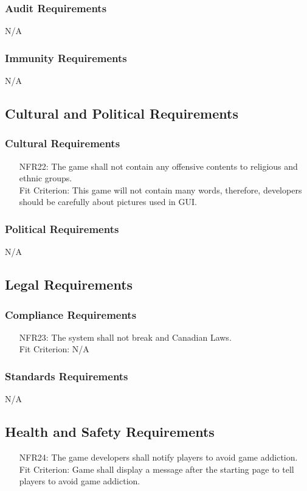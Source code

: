 \documentclass[12pt]{article}
\begin{document}
\subsubsection{Audit Requirements}
N/A
\subsubsection{Immunity Requirements}
N/A
\subsection{Cultural and Political Requirements}
\subsubsection{Cultural Requirements}
\begin{itemize}
\item[NFR22:]The game shall not contain any offensive contents
to religious and ethnic groups. \\Fit Criterion: This game 
will not contain many words, therefore, developers should be
carefully about pictures used in GUI.
\end{itemize}
\subsubsection{Political Requirements}
N/A
\subsection{Legal Requirements}
\subsubsection{Compliance Requirements}
\begin{itemize}
\item[NFR23:]The system shall not break and Canadian Laws. \\Fit Criterion: N/A
\end{itemize}
\subsubsection{Standards Requirements}
N/A
\subsection{Health and Safety Requirements}
\begin{itemize}
\item[NFR24:] The game developers shall notify players to 
avoid game addiction.\\Fit Criterion: Game shall display a message after the starting
page to tell players to avoid game addiction.
\end{itemize}
\newpage
\end{document}
